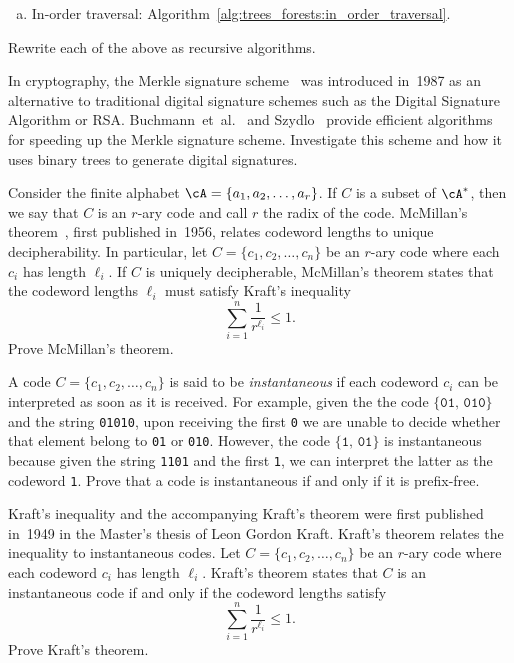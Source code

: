 \begin{problem}
\begin{enumerate}[(a)]
  \item In-order traversal:
    Algorithm~\ref{alg:trees_forests:in_order_traversal}.
  \end{enumerate}
  Rewrite each of the above as recursive
  algorithms.

\item In cryptography, the Merkle signature
  scheme~\cite{Merkle1987} was introduced in~1987 as an alternative to
  traditional digital signature schemes such as the Digital Signature
  Algorithm or RSA.
  Buchmann~et~al.~\cite{BuchmannEtAl2008} and Szydlo~\cite{Szydlo2004}
  provide efficient algorithms for speeding up the Merkle signature
  scheme. Investigate this scheme and how it uses binary trees to
  generate digital signatures.

\item Consider the finite alphabet
  $\cA = \{a_1, a_2, \dots, a_r\}$. If $C$ is a subset of $\cA^\ast$,
  then we say that $C$ is an $r$-ary code and call
  $r$ the radix of the code.
  McMillan's
  theorem~\cite{McMillan1956}, first published
  in~1956, relates codeword lengths to unique decipherability. In
  particular, let $C = \{c_1, c_2, \dots, c_n\}$ be an $r$-ary code
  where each $c_i$ has length $\ell_i$. If $C$ is uniquely
  decipherable, McMillan's theorem states that the codeword lengths
  $\ell_i$ must satisfy Kraft's inequality
  \[
  \sum_{i=1}^n \frac{1}{r^{\ell_i}}
  \leq
  1.
  \]
  Prove McMillan's theorem.

\item A code $C = \{c_1, c_2, \dots, c_n\}$ is said to be
  \emph{instantaneous} if each codeword $c_i$ can be interpreted as
  soon as it is received. For example, given the the code
  $\{\texttt{01},\, \texttt{010}\}$ and the string \texttt{01010},
  upon receiving the first \texttt{0} we are unable to decide whether
  that element belong to \texttt{01} or \texttt{010}. However, the
  code $\{\texttt{1},\, \texttt{01}\}$ is instantaneous because given
  the string \texttt{1101} and the first \texttt{1}, we can interpret
  the latter as the codeword \texttt{1}.  Prove that a code is
  instantaneous if and only if it is prefix-free.

\item Kraft's inequality and the accompanying
  Kraft's theorem were first published~\cite{Kraft1949} in~1949 in the
  Master's thesis of Leon Gordon Kraft.
  Kraft's theorem relates the inequality to
  instantaneous codes. Let $C = \{c_1, c_2, \dots, c_n\}$ be an
  $r$-ary code where each codeword $c_i$ has length $\ell_i$. Kraft's
  theorem states that $C$ is an instantaneous code if and only if the
  codeword lengths satisfy
  \[
  \sum_{i=1}^n \frac{1}{r^{\ell_i}}
  \leq
  1.
  \]
  Prove Kraft's theorem.


\end{problem}
